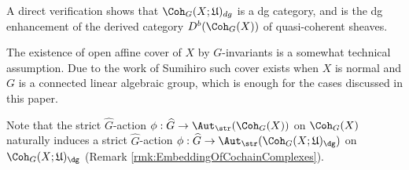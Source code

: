 \begin{dfn}
\end{dfn}
A direct verification shows that $\Coh_G (X;\mathfrak{U})_{dg}$ is a dg category, and is the dg enhancement of the derived category $D^b(\Coh_G (X))$ of quasi-coherent sheaves.
\begin{rmk}
    The existence of open affine cover of $X$ by $G$-invariants is a somewhat technical assumption. Due to the work of Sumihiro \cite{Sumihiro74} such cover exists when $X$ is normal and $G$ is a connected linear algebraic group, which is enough for the cases discussed in this paper.
\end{rmk}
Note that the strict $\widehat{G}$-action
$
\phi:
\widehat{G}
\rightarrow
\Aut_{\str}(\Coh_G(X))
$
on $\Coh_G(X)$
naturally induces a strict $\widehat{G}$-action
$
\phi:
\widehat{G}
\rightarrow
\Aut_{\str}(\Coh_G(X;\mathfrak{U})_{\dg})
$
on
$\Coh_G(X;\mathfrak{U})_{\dg}$
(Remark \ref{rmk:EmbeddingOfCochainComplexes}).

